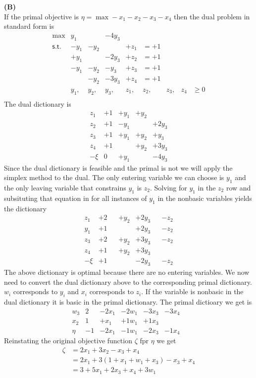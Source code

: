 \documentclass[11pt]{article}
\begin{document}
\medskip

\noindent\textbf{(B)}
\\
If the primal objective is $\eta = \max -x_1 - x_2 - x_3 - x_4$ then the dual problem in standard form is
\[\begin{array}{rllllllll}
\max & y_1 & & -4y_3 \\
\mathsf{s.t.} 
& -y_1 & -y_2 & & +z_1 & = +1 \\
& +y_1 & & -2y_3 & +z_2 & = +1 \\
& -y_1 & -y_2 & -y_3 & +z_3 & = +1 \\
& & -y_2 & -3y_3 & +z_4 & = +1 \\
& y_1, & y_2, & y_3, & z_1, & z_2, & z_3, & z_4 & \geq 0 \\
\end{array}\]
The dual dictionary is
\[\begin{array}{r|cccccccc}
z_1 & +1 & +y_1 & +y_2 \\
z_2 & +1 & -y_1 & & +2y_3 \\
z_3 & +1 & +y_1 & +y_2 & +y_3 \\
z_4 & +1 & & +y_2 & +3y_3 \\
\hline
-\xi & 0 & +y_1 & & -4y_3
\end{array}\]
Since the dual dictionary is feasible and the primal is not we will apply the simplex method to the dual.  The only entering variable we can choose is $y_1$ and the only leaving variable that constrains $y_1$ is $z_2$.  Solving for $y_1$ in the $z_2$ row and subsituting that equation in for all instances of $y_1$ in the nonbasic variables yields the dictionary
\[\begin{array}{r|cccccccc}
z_1 & +2 & & +y_2  & +2y_3 & & -z_2\\
y_1 & +1 & & & +2y_3 & & -z_2\\
z_3 & +2 & & +y_2 & +3y_3 & & -z_2 \\
z_4 & +1 & & +y_2 & +3y_3 \\
\hline
-\xi & +1 & & & -2y_3 & & -z_2
\end{array}\]
The above dictionary is optimal because there are no entering variables.  We now need to convert the dual dictionary above to the corresponding primal dictionary.  $w_i$ corresponds to $y_i$ and $x_i$ corresponds to $z_i$.  If the variable is nonbasic in the dual dictionary it is basic in the primal dictionary.  The primal dictioary we get is
\[\begin{array}{r|cccccccc}
w_3 & 2 & -2x_1 & -2w_1 & -3x_3 & -3x_4 \\
x_2 & 1 & +x_1 & +1w_1 & +1x_3 & & \\
\hline
\eta & -1 & -2x_1 & -1w_1 & -2x_3 & -1x_4
\end{array}\]
Reinstating the original objective function $\zeta$ fpr $\eta$ we get
\begin{align*}
\zeta & = 2x_1 + 3x_2  - x_3 + x_4 \\
& = 2x_1 + 3(1 +x_1 +w_1 +x_3) - x_3 + x_4 \\
& = 3 + 5x_1 + 2x_3 + x_4 + 3w_1 \\
\end{align*}
\end{document}
